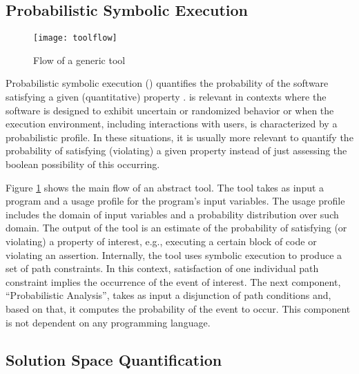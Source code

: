 \documentclass[10pt]{article}
\newcounter{list}
\begin{document}
\subsection{Probabilistic Symbolic Execution}
\begin{figure}[h]
  \centering
\texttt{[image: toolflow]}
\caption{Flow of a generic \PSE{} tool}
\vspace{-5mm}
\label{figToolflow}
\end{figure}

Probabilistic symbolic execution (\PSE{}) quantifies the probability
of the software satisfying a given (quantitative) property
\cite{filieri2013reliability,geldenhuys2012probabilistic,sankaranarayanan2013static,borges2014compositional}.
\PSE{} is relevant in contexts where the software is designed to
exhibit uncertain or randomized behavior or when the execution
environment, including interactions with users, is characterized by a
probabilistic profile. In these situations, it is usually more
relevant to quantify the probability of satisfying (violating) a given
property instead of just assessing the boolean possibility of this
occurring.


Figure \ref{figToolflow} shows the main flow of an abstract \PSE{}
tool. The tool takes as input a program and a usage profile for the
program’s input variables. The usage profile includes the domain of
input variables and a probability distribution over such domain. The
output of the tool is an estimate of the probability of satisfying (or
violating) a property of interest, e.g., executing a certain block of
code or violating an assertion. Internally, the tool uses symbolic
execution to produce a set of path constraints. In this context,
satisfaction of one individual path constraint implies the occurrence
of the event of interest. The next component, ``Probabilistic
Analysis'', takes as input a disjunction of path conditions and, based
on that, it computes the probability of the event to occur. This
component is not dependent on any programming language.

\subsection{Solution Space Quantification}
\end{document}

